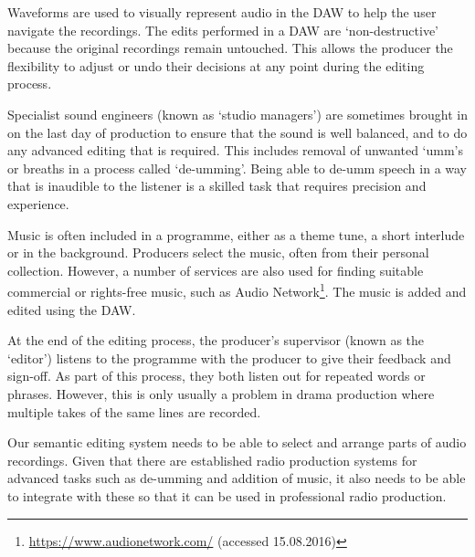 Waveforms are used to visually represent audio in the DAW to help the user navigate the recordings. The edits performed
in a DAW are `non-destructive' because the original recordings remain untouched. This allows the producer the
flexibility to adjust or undo their decisions at any point during the editing process.

Specialist sound engineers (known as `studio managers') are sometimes brought in on the last day of production to
ensure that the sound is well balanced, and to do any advanced editing that is required. This includes removal of
unwanted `umm's or breaths in a process called `de-umming'. Being able to de-umm speech in a way that is inaudible to
the listener is a skilled task that requires precision and experience.

Music is often included in a programme, either as a theme tune, a short interlude or in the background. Producers
select the music, often from their personal collection. However, a number of services are also used for finding
suitable commercial or rights-free music, such as Audio Network\footnote{\url{https://www.audionetwork.com/} (accessed
  15.08.2016)}.  The music is added and edited using the DAW.

At the end of the editing process, the producer's supervisor (known as the `editor') listens to the programme with the
producer to give their feedback and sign-off. As part of this process, they both listen out for repeated words or
phrases. However, this is only usually a problem in drama production where multiple takes of the same lines are
recorded.

Our semantic editing system needs to be able to select and arrange parts of audio recordings. Given that there are
established radio production systems for advanced tasks such as de-umming and addition of music, it also needs to be
able to integrate with these so that it can be used in professional radio production.


%
%
%
%
%
%

